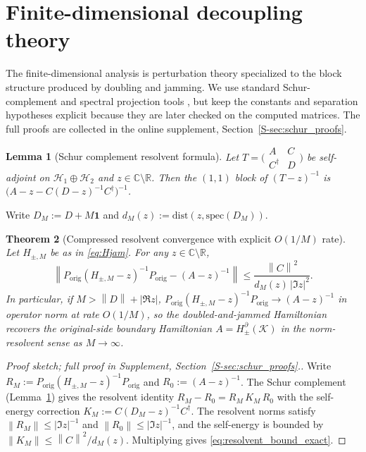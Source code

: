 \documentclass[11pt]{article}
\numberwithin{equation}{section}
\newtheorem{theorem}{Theorem}[section]
\newtheorem{lemma}[theorem]{Lemma}
\theoremstyle{definition}
\theoremstyle{remark}
\newcommand{\K}{\mathcal{K}}
\newcommand{\Hil}{\mathcal{H}}
\newcommand{\bd}{\partial}
\newcommand{\Id}{\mathbf{1}}
\newcommand{\spec}{\mathrm{spec}}
\newcommand{\dist}{\mathrm{dist}}
\newcommand{\opnorm}[1]{\left\lVert#1\right\rVert}
\begin{document}
\section{Finite-dimensional decoupling theory}\label{sec:decoupling}

The finite-dimensional analysis is perturbation theory specialized to the block structure produced
by doubling and jamming. We use standard Schur-complement and spectral projection tools
\cite[Chapter~II]{KatoPerturbation,BhatiaMatrixAnalysis}, but keep the constants and separation
hypotheses explicit because they are later checked on the computed matrices. The full proofs are
collected in the online supplement, Section~\ref{S-sec:schur_proofs}.

\begin{lemma}[Schur complement resolvent formula]\label{lem:schur}
Let $T=\bigl(\begin{smallmatrix}A&C\\ C^\dagger&D\end{smallmatrix}\bigr)$ be self-adjoint on
$\Hil_1\oplus\Hil_2$ and $z\in\mathbb C\setminus\mathbb R$. Then the $(1,1)$ block of $(T-z)^{-1}$
is $\bigl(A-z-C(D-z)^{-1}C^\dagger\bigr)^{-1}$.
\end{lemma}

Write $D_M:=D+M\Id$ and $d_M(z):=\dist(z,\spec(D_M))$.

\begin{theorem}[Compressed resolvent convergence with explicit $O(1/M)$ rate]\label{thm:resolvent}
Let $H_{\pm,M}$ be as in \eqref{eq:Hjam}. For any $z\in\mathbb C\setminus\mathbb R$,
\begin{equation}\label{eq:resolvent_bound_exact}
\opnorm{P_{\mathrm{orig}}(H_{\pm,M}-z)^{-1}P_{\mathrm{orig}}-(A-z)^{-1}}
\le
\frac{\opnorm{C}^2}{d_M(z)\,|\Im z|^2}.
\end{equation}
In particular, if $M>\opnorm{D}+|\Re z|$,
$P_{\mathrm{orig}}(H_{\pm,M}-z)^{-1}P_{\mathrm{orig}}\to(A-z)^{-1}$ in operator norm at rate
$O(1/M)$, so the doubled-and-jammed Hamiltonian recovers the original-side boundary Hamiltonian
$A=H_{\pm}^{\bd}(\K)$ in the norm-resolvent sense as $M\to\infty$.
\end{theorem}

\begin{proof}[Proof sketch; full proof in Supplement, Section~\ref{S-sec:schur_proofs}.]
Write $R_M:=P_{\mathrm{orig}}(H_{\pm,M}-z)^{-1}P_{\mathrm{orig}}$ and $R_0:=(A-z)^{-1}$.
The Schur complement (Lemma~\ref{lem:schur}) gives the resolvent identity
$R_M-R_0=R_M\,K_M\,R_0$ with the self-energy correction
$K_M:=C(D_M-z)^{-1}C^\dagger$. The resolvent norms satisfy
$\opnorm{R_M}\le|\Im z|^{-1}$ and $\opnorm{R_0}\le|\Im z|^{-1}$, and the self-energy is
bounded by $\opnorm{K_M}\le\opnorm{C}^2/d_M(z)$. Multiplying gives
\eqref{eq:resolvent_bound_exact}.
\end{proof}
\end{document}
